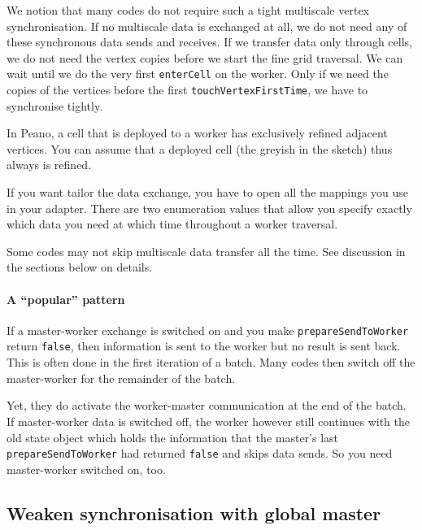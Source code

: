 We notion that many codes do not require such a tight multiscale vertex
synchronisation.
If no multiscale data is exchanged at all, we do not need any of these
synchronous data sends and receives.
If we transfer data only through cells, we do not need the vertex copies before
we start the fine grid traversal.
We can wait until we do the very first \texttt{enterCell} on the worker.
Only if we need the copies of the vertices before the first
\texttt{touchVertexFirstTime}, we have to synchronise tightly.


\begin{remark}
In Peano, a cell that is deployed to a worker has exclusively refined adjacent
vertices. 
You can assume that a deployed cell (the greyish in the sketch) thus always is
refined.
\end{remark}


If you want tailor the data exchange, you have to open all the mappings you use
in your adapter.
There are two enumeration values that allow you specify exactly which data you
need at which time throughout a worker traversal.


\begin{remark}
Some codes may not skip multiscale data transfer all the time. See discussion in
the sections below on details.
\end{remark}


\paragraph{A ``popular'' pattern}

If a master-worker exchange is switched on and you make
\texttt{prepareSendToWorker} return \texttt{false}, then information is
sent to the worker but no result is sent back.
This is often done in the first iteration of a batch.
Many codes then switch off the master-worker for the remainder of the batch.

Yet, they do activate the worker-master communication at the end of the batch. 
If master-worker data is switched off, the worker however still continues with
the old state object which holds the information that the master's last 
\texttt{prepareSendToWorker} had returned \texttt{false} and skips data sends.
So you need master-worker switched on, too.



\subsection{Weaken synchronisation with global master}

